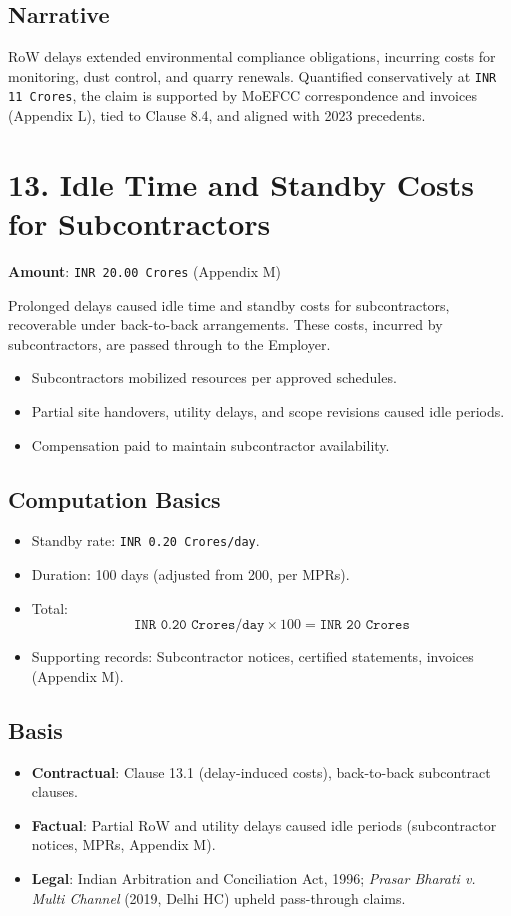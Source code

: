 \documentclass[12pt,letterpaper]{article}
\begin{document}
	\subsection*{Narrative}
	RoW delays extended environmental compliance obligations, incurring costs for monitoring, dust control, and quarry renewals. Quantified conservatively at \texttt{INR 11 Crores}, the claim is supported by MoEFCC correspondence and invoices (Appendix L), tied to Clause 8.4, and aligned with 2023 precedents.
	
	\section*{13. Idle Time and Standby Costs for Subcontractors}
	\textbf{Amount}: \texttt{INR 20.00 Crores} (Appendix M)
	
	Prolonged delays caused idle time and standby costs for subcontractors, recoverable under back-to-back arrangements. These costs, incurred by subcontractors, are passed through to the Employer.
	
	\begin{itemize}
		\item Subcontractors mobilized resources per approved schedules.
		\item Partial site handovers, utility delays, and scope revisions caused idle periods.
		\item Compensation paid to maintain subcontractor availability.
	\end{itemize}
	
	\subsection*{Computation Basics}
	\begin{itemize}
		\item Standby rate: \texttt{INR 0.20 Crores/day}.
		\item Duration: 100 days (adjusted from 200, per MPRs).
		\item Total:
		\[
		\texttt{INR 0.20 Crores/day} \times 100 = \texttt{INR 20 Crores}
		\]
		\item Supporting records: Subcontractor notices, certified statements, invoices (Appendix M).
	\end{itemize}
	
	\subsection*{Basis}
	\begin{itemize}
		\item \textbf{Contractual}: Clause 13.1 (delay-induced costs), back-to-back subcontract clauses.
		\item \textbf{Factual}: Partial RoW and utility delays caused idle periods (subcontractor notices, MPRs, Appendix M).
		\item \textbf{Legal}: Indian Arbitration and Conciliation Act, 1996; \textit{Prasar Bharati v. Multi Channel} (2019, Delhi HC) upheld pass-through claims.
	\end{itemize}
	
\end{document}

